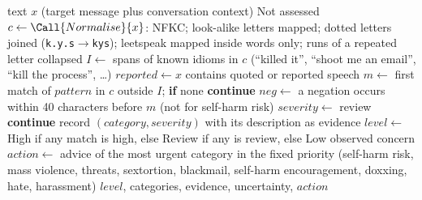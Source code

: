 \begin{algorithm}[!htbp]
\caption{Harmful-language assessment}\label{alg:harm}
\begin{algorithmic}[1]
\Require text $x$ (target message plus conversation context)
 \Return Not assessed \EndIf
\State $c \gets \Call{Normalise}{x}$: NFKC; look-alike letters mapped; dotted letters joined (\texttt{k.y.s}$\to$\texttt{kys}); leetspeak mapped inside words only; runs of a repeated letter collapsed
\State $I \gets$ spans of known idioms in $c$ (``killed it'', ``shoot me an email'', ``kill the process'', \dots)
\State $reported \gets x$ contains quoted or reported speech
  \State $m \gets$ first match of $pattern$ in $c$ outside $I$; \textbf{if} none \textbf{continue}
  \State $neg \gets$ a negation occurs within 40 characters before $m$ (not for self-harm risk)
   $severity \gets$ review
   \textbf{continue}
  \EndIf
  \State record $(category, severity)$ with its description as evidence
\EndFor
\State $level \gets$ High if any match is high, else Review if any is review, else Low observed concern
\State $action \gets$ advice of the most urgent category in the fixed priority (self-harm risk, mass violence, threats, sextortion, blackmail, self-harm encouragement, doxxing, hate, harassment)
\State \Return $level$, categories, evidence, uncertainty, $action$
\end{algorithmic}
\end{algorithm}

